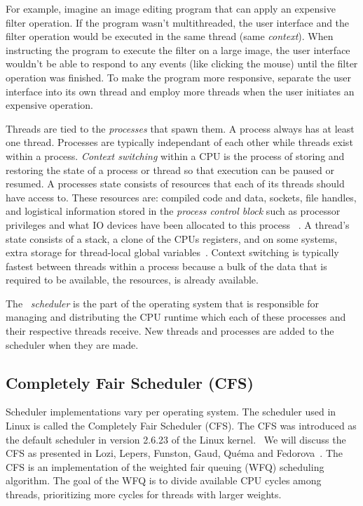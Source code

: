 \documentclass{sig-alternate}
\begin{document}
For example, imagine an image editing program that can apply an expensive filter operation. If the program wasn't multithreaded, the user interface and the filter operation would be executed in the same thread (same \emph{context}). When instructing the program to execute the filter on a large image, the user interface wouldn't be able to respond to any events (like clicking the mouse) until the filter operation was finished. To make the program more responsive, separate the user interface into its own thread and employ more threads when the user initiates an expensive operation.
	
Threads are tied to the \emph{processes} that spawn them. A process always has at least one thread. Processes are typically independant of each other while threads exist within a process. \emph{Context switching} within a CPU is the process of storing and restoring the state of a process or thread so that execution can be paused or resumed. A processes state consists of resources that each of its threads should have access to. These resources are: compiled code and data, sockets, file handles, and logistical information stored in the \emph{process control block} such as processor privileges and what IO devices have been allocated to this process ~\cite{WikiProcessControlBlock,WikiThreads}. A thread's state consists of a stack, a clone of the CPUs registers, and on some systems, extra storage for thread-local global variables~\cite{WikiThreads,WikiThreadLocalStorage}. Context switching is typically fastest between threads within a process because a bulk of the data that is required to be available, the resources, is already available.~\cite{WikiThreads} 

The ~\emph{scheduler} is the part of the operating system that is responsible for managing and distributing the CPU runtime which each of these processes and their respective threads receive. New threads and processes are added to the scheduler when they are made.~\cite{Lozi:2016}

\subsection{Completely Fair Scheduler (CFS)}
\label{sec:cfs}

Scheduler implementations vary per operating system. The scheduler used in Linux is called the Completely Fair Scheduler (CFS). The CFS was introduced as the default scheduler in version 2.6.23 of the Linux kernel.~\cite{JoEtal:2017} We will discuss the CFS as presented in Lozi, Lepers, Funston, Gaud, Qu\'ema and Fedorova~\cite{Lozi:2016}. The CFS is an implementation of the weighted fair queuing (WFQ) scheduling algorithm. The goal of the WFQ is to divide available CPU cycles among threads, prioritizing more cycles for threads with larger weights.~\cite{Lozi:2016}
\end{document}
